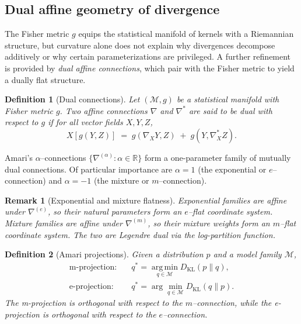 \documentclass[11pt]{article}
\newtheorem{definition}{Definition}
\newtheorem{remark}{Remark}
\newcommand{\1}{\mathbf{1}}
\begin{document}
\subsection{Dual affine geometry of divergence}

The Fisher metric $g$ equips the statistical manifold of kernels with a Riemannian structure,
but curvature alone does not explain why divergences decompose additively or why certain
parameterizations are privileged. A further refinement is provided by \emph{dual affine
connections}, which pair with the Fisher metric to yield a dually flat structure.

\begin{definition}[Dual connections]
Let $(\mathcal M,g)$ be a statistical manifold with Fisher metric $g$.
Two affine connections $\nabla$ and $\nabla^\ast$ are said to be \emph{dual} with respect
to $g$ if for all vector fields $X,Y,Z$,
\[
X[g(Y,Z)] \;=\; g(\nabla_X Y,Z) \;+\; g(Y,\nabla^\ast_X Z).
\]
\end{definition}

Amari's $\alpha$--connections $\{\nabla^{(\alpha)} : \alpha\in\mathbb R\}$ form
a one-parameter family of mutually dual connections. Of particular importance are
$\alpha=1$ (the exponential or $e$--connection) and $\alpha=-1$ (the mixture or $m$--connection).

\begin{remark}[Exponential and mixture flatness]
Exponential families are affine under $\nabla^{(e)}$, so their natural parameters form an
$e$--flat coordinate system. Mixture families are affine under $\nabla^{(m)}$, so their
mixture weights form an $m$--flat coordinate system. The two are Legendre dual via the
log-partition function.
\end{remark}

\begin{definition}[Amari projections]
Given a distribution $p$ and a model family $\mathcal M$,
\begin{align*}
\text{m-projection:} & \quad q^\ast = \operatorname*{arg\,min}_{q\in\mathcal M} D_{\mathrm{KL}}(p\|q), \\
\text{e-projection:} & \quad q^\ast = \arg\min_{q\in\mathcal M} D_{\mathrm{KL}}(q\|p).
\end{align*}
The m-projection is orthogonal with respect to the $m$--connection,
while the e-projection is orthogonal with respect to the $e$--connection.
\end{definition}
\end{document}
